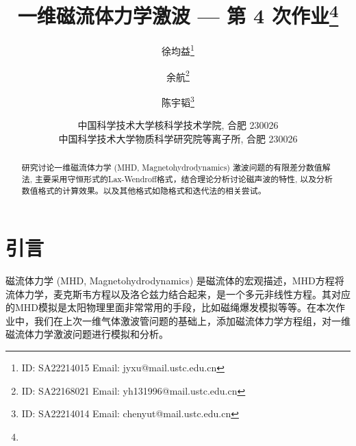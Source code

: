\documentclass[10.5pt
]{article}
\title{一维磁流体力学激波 --- 第 4 次作业\footnote{\Term\Course}}
\author{徐均益\footnote{ID: SA22214015 Email: jyxu@mail.ustc.edu.cn}
  \and
  余航\footnote{ID: SA22168021 Email: yh131996@mail.ustc.edu.cn}
  \and
  陈宇韬\footnote{ID: SA22214014 Email: chenyut@mail.ustc.edu.cn}
}
\date{%
\scriptsize%
中国科学技术大学核科学技术学院, 合肥 230026 \\
中国科学技术大学物质科学研究院等离子所, 合肥 230026
%
}
\begin{document}
\maketitle

\begin{abstract}
研究讨论一维磁流体力学 (MHD, Magnetohydrodynamics) 激波问题的有限差分数值解法, 主要采用守恒形式的Lax-Wendroff格式，结合理论分析讨论磁声波的特性,
以及分析数值格式的计算效果。以及其他格式如隐格式和迭代法的相关尝试。
\end{abstract}

\section{引言}
磁流体力学 (MHD, Magnetohydrodynamics) 是磁流体的宏观描述，MHD方程将流体力学，麦克斯韦方程以及洛仑兹力结合起来，是一个多元非线性方程。其对应的MHD模拟是太阳物理里面非常常用的手段，比如磁绳爆发模拟等等。在本次作业中，我们在上次一维气体激波管问题的基础上，添加磁流体力学方程组，对一维磁流体力学激波问题进行模拟和分析。
\end{document}
